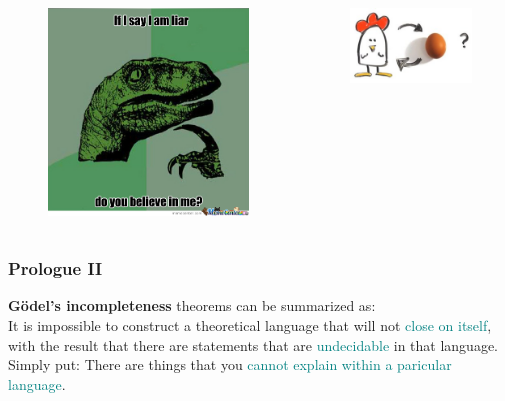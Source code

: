 \documentclass[
	11pt,
	aspectratio=169,
]{beamer}
\begin{document}
\begin{frame}
\begin{columns}
\begin{figure}
        				\includegraphics[width=\textwidth]{resources/liar.jpg}
        			\end{figure}
        			\begin{figure}
        				\includegraphics[width=\textwidth]{resources/chickenegg.jpg}
        			\end{figure}
        	\end{columns}
        \end{frame}

        \begin{frame}
        \frametitle{Prologue II}
        	{\textbf{Gödel's incompleteness} theorems can be summarized as: \\
        		It is impossible to construct a theoretical language that will not \textcolor{teal}{close on itself}, with the result that there are statements that are \textcolor{teal}{undecidable} in that language.} \\
        	\vspace{0.5cm}
        	{Simply put: There are things that you \textcolor{teal}{cannot explain within a paricular language}.}
        \end{frame}
\end{document}
